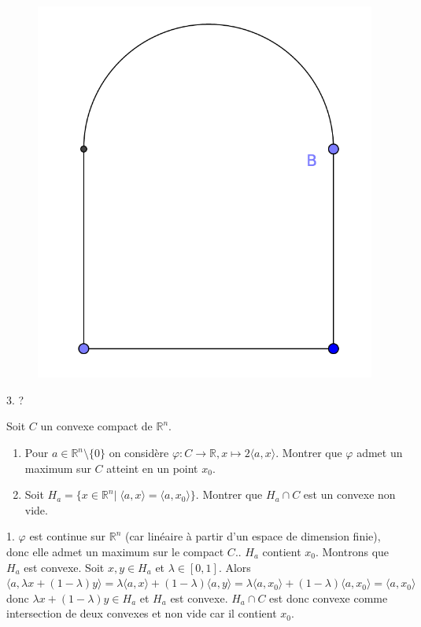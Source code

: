 \documentclass{fancybook}
\begin{document}
\begin{figure}[h]
\includegraphics[scale=0.5]{images/1.png}
\centering 
\end{figure}

3. ?


\begin{exercice}
Soit $C$ un convexe compact de $\mathbb R^n$. 
\begin{enumerate}
\item Pour $a\in \mathbb R^n\setminus \{0\}$ on considère $\varphi:C\to \mathbb R, x\mapsto 2\langle a,x\rangle$. Montrer que $\varphi$ admet un maximum sur $C$ atteint en un point $x_0$.
\item Soit $H_a=\{x\in \mathbb R^n|\; \langle a,x\rangle=\langle a,x_0\rangle \}$. Montrer que $H_a\cap C$ est un convexe non vide.
\end{enumerate}
\end{exercice}
1. $\varphi$ est continue sur $\mathbb R^n$ (car linéaire à partir d'un espace de dimension finie), donc elle admet un maximum sur le compact $C$.. $H_a$ contient $x_0$. Montrons que $H_a$ est convexe. Soit $x,y\in H_a$ et $\lambda\in [0,1]$. Alors $\langle a,\lambda x +(1-\lambda)y\rangle = \lambda \langle a,x\rangle + (1-\lambda) \langle a,y\rangle = \lambda \langle a,x_0\rangle + (1-\lambda) \langle a,x_0\rangle = \langle a,x_0\rangle$ donc $\lambda x +(1-\lambda)y\in H_a$ et $H_a$ est convexe.\newline 
$H_a\cap C$ est donc convexe comme intersection de deux convexes et non vide car il contient $x_0$.
\end{document}
